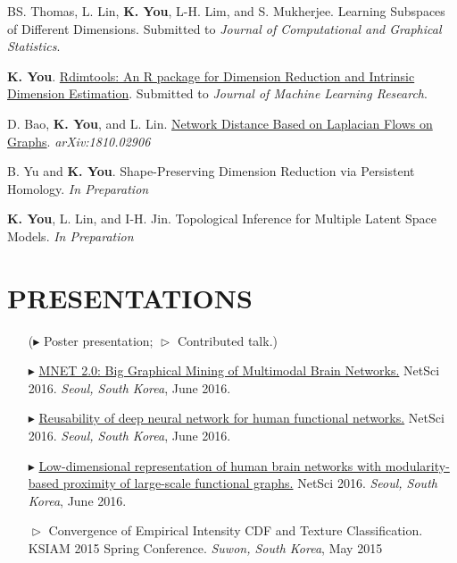 \documentclass[margin, 10pt]{res} %
\begin{document}
\begin{resume}
\begin{enumerate}[label={[\roman*]}] 
	\item BS. Thomas, L. Lin, \textbf{K. You}, L-H. Lim, and S. Mukherjee. Learning Subspaces of Different Dimensions. Submitted to \textit{Journal of Computational and Graphical Statistics}.
	\item \textbf{K. You}. \href{https://arxiv.org/abs/2005.11107}{Rdimtools: An R package for Dimension Reduction and Intrinsic Dimension Estimation}. Submitted to \textit{Journal of Machine Learning Research}.
	\item D. Bao, \textbf{K. You}, and L. Lin. \href{https://arxiv.org/abs/1810.02906}{Network Distance Based on Laplacian Flows on Graphs}. {\it arXiv:1810.02906}
	\item B. Yu and \textbf{K. You}. Shape-Preserving Dimension Reduction via Persistent Homology. \textit{In Preparation}
	\item \textbf{K. You}, L. Lin, and I-H. Jin. Topological Inference for Multiple Latent Space Models. \textit{In Preparation}
\end{enumerate}
\vspace{.2cm}


\section{\sf PRESENTATIONS}

\begin{itemize}
	\item[]($\blacktriangleright$ Poster presentation; $\vartriangleright$ Contributed talk.)
	\item[$\blacktriangleright$] 
	\href{http://kyoustat.com/presentation/2016_NetSci_MNET.pdf}{MNET 2.0: Big Graphical Mining of Multimodal Brain Networks.} NetSci 2016. \emph{Seoul, South Korea}, June 2016.
	\item[$\blacktriangleright$]
	\href{http://kyoustat.com/presentation/2016_NetSci_DeepLearning.pdf}{Reusability of deep neural network for human functional networks.} NetSci 2016. \emph{Seoul, South Korea}, June 2016.
	\item[$\blacktriangleright$] 
	\href{http://kyoustat.com/presentation/2016_NetSci_LAMP.pdf}{Low-dimensional representation of human brain networks with modularity-based proximity of large-scale functional graphs.} NetSci 2016. \emph{Seoul, South Korea}, June 2016.
	\item[$\vartriangleright$]
	Convergence of Empirical Intensity CDF and Texture Classification. KSIAM 2015 Spring Conference. \emph{Suwon, South Korea}, May 2015
\end{itemize}


\end{resume}
\end{document}
